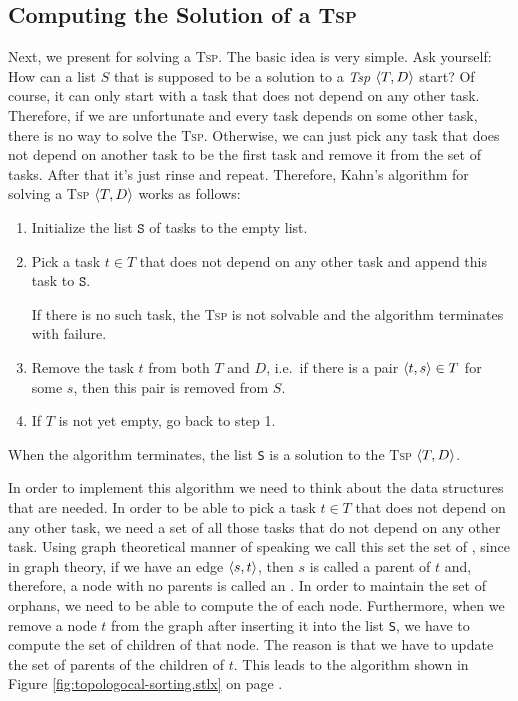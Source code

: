 \subsection{Computing the Solution of a \textsc{Tsp}}
Next, we present  \cite{kahn:1962} for solving a \textsc{Tsp}.  The basic idea is very
simple. Ask yourself:  How can a list $S$ that is supposed to be a solution to a \textsl{Tsp} $\pair(T, D)$ start?
Of course, it can only start with a task that does not depend on any other task.  Therefore, if we are
unfortunate and every task depends on some other task, there is no way to solve the \textsc{Tsp}.  Otherwise,
we can just pick any task that does not depend on another task to be the first task and remove it from the set
of tasks.  After that it's just rinse and repeat.  Therefore, Kahn's algorithm for solving a \textsc{Tsp}
$\pair(T, D)$ works as follows: 
\begin{enumerate}
\item Initialize the list $\texttt{S}$ of tasks to the empty list.
\item Pick a task $t \in T$ that does not depend on any other task and append this task to $\texttt{S}$.

      If there is no such task, the \textsc{Tsp} is not solvable and the algorithm terminates with failure.
\item Remove the task $t$ from both $T$ and $D$, i.e.~if there is a pair $\pair(t, s) \in T$ for some $s$, then
      this pair is removed from $S$.
\item If $T$ is not yet empty, go back to step 1.  
\end{enumerate}
When the algorithm terminates, the list \texttt{S} is a solution to the \textsc{Tsp} $\pair(T, D)$.

In order to implement this algorithm we need to think about the data structures that are needed.
In order to be able to pick a task $t \in T$ that does not depend on any other task, we need a set of all those
tasks that do not depend on any other task.  Using graph theoretical manner of speaking we call this set the
set of , since in graph theory, if we have an edge $\pair(s, t)$, then $s$ is called a parent of
$t$ and, therefore, a node with no parents is called an .  In order to maintain the set of
orphans, we need to be able to compute the  of each node.  Furthermore, when we remove a node $t$
from the graph after inserting it into the list \texttt{S}, we have to compute the set of children of that
node.  The reason is that we have to update the set of parents of the children of $t$.  This leads to the algorithm
shown in Figure \ref{fig:topologocal-sorting.stlx} on page \pageref{fig:topologocal-sorting.stlx}.

